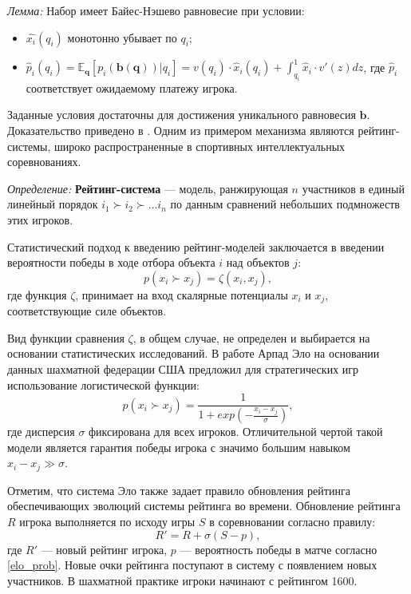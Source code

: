 \textit{Лемма:} Набор имеет Байес-Нэшево равновесие при условии:
 \begin{itemize}
    \item $\hat{x_i}(q_i)$ монотонно убывает по $q_i$;
    \item $\hat{p}_i(q_i) = \mathbb{E}_{\mathbf{q}}\left[p_i(\mathbf{b}(\mathbf{q}))|q_i\right] = v(q_i) \cdot \hat{x}_i(q_i) + \int_{q_i}^1 \hat{x}_i \cdot v'(z) dz$, где $\hat{p}_i$ соответствует ожидаемому платежу игрока.
\end{itemize}
Заданные условия достаточны для достижения уникального равновесия $\mathbf{b}$. Доказательство приведено в \cite{myerson1981optimal}.
Одним из примером механизма являются рейтинг-системы, широко распространенные в спортивных интеллектуальных соревнованиях.

\textit{Определение:} \textbf{Рейтинг-система} --- модель, ранжирующая $n$ участников в единый линейный порядок $i_1 \succ i_2 \succ \dots i_n$
по данным сравнений небольших подмножеств этих игроков.
 
Статистический подход к введению рейтинг-моделей заключается \cite{bradley1952rank} 
в введении вероятности победы в ходе отбора объекта $i$ над объектов  $j$:
\begin{equation}
    p(x_i \succ x_j) = \zeta(x_i,x_j),
\end{equation}
где функция $\zeta$, принимает на вход скалярные потенциалы $x_i$ и $x_j$, соответствующие силе объектов.

Вид функции сравнения $\zeta$, в общем случае, не определен и выбирается на основании статистических исследований.
В работе \cite{elo1967proposed} Арпад Эло на основании данных шахматной федерации США предложил
для стратегических игр использование логистической функции:
\begin{equation}
    p(x_i \succ x_j) = \frac{1}{1 + exp(-\frac{x_i- x_j}{\sigma})},
    \label{elo_prob}
\end{equation}
где дисперсия $\sigma$ фиксирована для всех игроков. Отличительной чертой такой модели является
гарантия победы игрока с значимо большим навыком $x_i- x_j \gg \sigma$.

Отметим, что система Эло также задает правило обновления рейтинга обеспечивающих эволюций системы рейтинга во времени. 
Обновление рейтинга $R$ игрока выполняется по исходу игры $S$ в соревновании согласно правилу:
\begin{equation}
    R' = R + \sigma (S-p),
\end{equation}
где $R'$ --- новый рейтинг игрока, $p$ --- вероятность победы в матче согласно \ref{elo_prob}.
Новые очки рейтинга поступают в систему с появлением новых участников. В шахматной практике игроки начинают
с рейтингом 1600.



